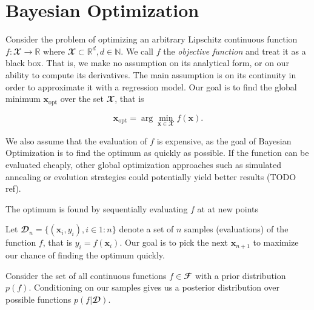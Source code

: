 \section{Bayesian Optimization}

Consider the problem of optimizing an arbitrary Lipschitz continuous function
$f: 𝓧 → ℝ$ where $𝓧 ⊂ ℝ^d, d ∈ ℕ$. We call $f$ the \emph{objective function}
and treat it as a black box. That is, we make no assumption on its analytical
form, or on our ability to compute its derivatives. The main assumption is on
its continuity in order to approximate it with a regression model. Our goal is
to find the global minimum $\symbf{x}_\text{opt}$ over the set $𝓧$, that is

$$
  \symbf{x}_\text{opt} = \arg\min_{\symbf{x} ∈ 𝓧} f(\symbf{x}).
$$

We also assume that the evaluation of $f$ is expensive, as the goal of Bayesian
Optimization is to find the optimum as quickly as possible. If the function can
be evaluated cheaply, other global optimization approaches such as simulated
annealing or evolution strategies could potentially yield better results (TODO
ref).

The optimum is found by sequentially evaluating $f$ at at new points

Let $𝓓_n = \{ (\symbf{x}_i, y_i), i \in 1:n\}$ denote a set of $n$ samples
(evaluations) of the function $f$, that is $y_i = f(\symbf{x}_i)$. Our goal is
to pick the next $\symbf{x}_{n+1}$ to maximize our chance of finding the
optimum quickly.

Consider the set of all continuous functions $f ∈ 𝓕$ with a prior distribution $p(f)$.
Conditioning on our samples gives us a posterior distribution over possible
functions $p(f | 𝓓)$.
